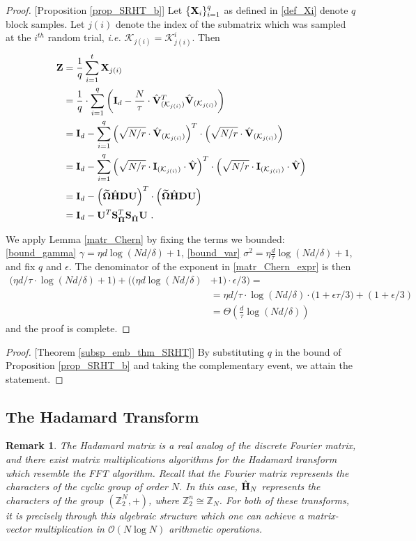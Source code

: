 \documentclass[journal,letterpaper,onecolumn,twoside,nofonttune]{IEEEtran}
\newcommand{\ow}{\mathcal{O}}
\newcommand{\K}{\mathcal{K}}
\newcommand{\Ub}{\bold{U}}
\newcommand{\Xb}{\bold{X}}
\newcommand{\Zb}{\bold{Z}}
\newcommand{\Pibold}{\bold{\Pi}}
\newcommand{\Pibh}{\hat{\Pibold}}
\newcommand{\Omb}{\bold{\Omega}}
\newcommand{\Ombwt}{\widetilde{\Omb}}
\newcommand{\Z}{\mathbb{Z}}
\newcommand{\Sb}{\bold{S}}
\newcommand{\SbPh}{\Sb_{\Pibh}}
\newcommand{\Db}{\bold{D}}
\newcommand{\Ib}{\bold{I}}
\newcommand{\Hbh}{\hat{\bold{H}}}
\newcommand{\Vbh}{\hat{\bold{V}}}
\newtheorem{Rmk}{Remark}
\begin{document}
\begin{proof}{[Proposition \ref{prop_SRHT_b}]}
Let $\{\Xb_i\}_{i=1}^q$ as defined in \eqref{def_Xi} denote $q$ block samples. Let $j(i)$ denote the index of the submatrix which was sampled at the $i^{th}$ random trial, \textit{i.e.} $\K_{j(i)}=\K_{j(i)}^i$. Then
\begin{align*}
  \Zb &= \frac{1}{q}\sum_{i=1}^t \Xb_{j(i)}\\
  &= \frac{1}{q}\cdot\sum_{i=1}^q\left(\Ib_d-\frac{N}{\tau}\cdot \Vbh_{(\K_{j(i)})}^T\Vbh_{(\K_{j(i)})}\right)\\
  &= \Ib_d-\sum_{i=1}^q\left(\sqrt{N/r}\cdot \Vbh_{(\K_{j(i)})}\right)^T\cdot\left(\sqrt{N/r}\cdot \Vbh_{(\K_{j(i)})}\right)\\
  &= \Ib_d-\sum_{i=1}^q\left(\sqrt{N/r}\cdot\Ib_{(\K_{j(i)})}\cdot \Vbh\right)^T\cdot\left(\sqrt{N/r}\cdot\Ib_{(\K_{j(i)})}\cdot \Vbh\right)\\
  &= \Ib_d-\left(\Ombwt\Hbh\Db\Ub\right)^T\cdot\left(\Ombwt\Hbh\Db\Ub\right)\\
  &= \Ib_d - \Ub^T\SbPh^T\SbPh\Ub\ .
\end{align*}

We apply Lemma \ref{matr_Chern} by fixing the terms we bounded: \eqref{bound_gamma} $\gamma=\eta d\log(Nd/\delta)+1$, \eqref{bound_var} $\sigma^2=\eta \frac{d}{\tau}\log(Nd/\delta)+1$, and fix $q$ and $\epsilon$. The denominator of the exponent in \eqref{matr_Chern_expr} is then
\begin{align*}
  \big(\eta d/\tau\cdot\log(Nd/\delta)+1\big)+\big((\eta d\log(Nd/\delta)&+1)\cdot\epsilon/3\big) = \\
  &= \eta d/\tau\cdot\log(Nd/\delta)\cdot\big(1+\epsilon\tau/3\big)+(1+\epsilon/3)\\
  &= \Theta\left(\frac{d}{\tau}\log(Nd/\delta)\right) 
\end{align*}
and the proof is complete.
\end{proof}

\begin{proof}{[Theorem \ref{subsp_emb_thm_SRHT}]}
By substituting $q$ in the bound of Proposition \ref{prop_SRHT_b} and taking the complementary event, we attain the statement.
\end{proof}

\subsection{The Hadamard Transform}

\begin{Rmk}
The Hadamard matrix is a real analog of the discrete Fourier matrix, and there exist matrix multiplications algorithms for the Hadamard transform which resemble the FFT algorithm. Recall that the Fourier matrix represents the characters of the cyclic group of order $N$. In this case, $\Hbh_N$ represents the characters of the group $(\Z_2^N,+)$, where $\Z_2^n\cong\Z_{N}$. For both of these transforms, it is precisely through this algebraic structure which one can achieve a matrix-vector multiplication in $\ow(N\log N)$ arithmetic operations.
\end{Rmk}
\end{document}
